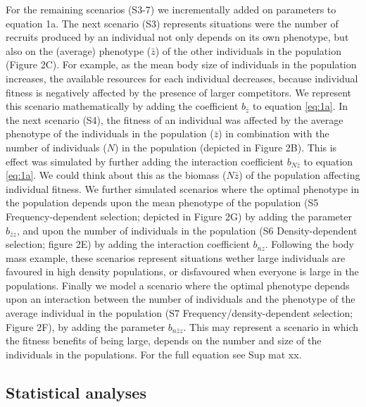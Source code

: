 \documentclass{article}
\begin{document}
For the remaining scenarios (S3-7) we incrementally added on parameters to equation 1a. The next scenario (S3) represents situations were the number of recruits produced by an individual not only depends on its own phenotype, but also on the (average) phenotype ($\bar{z}$) of the other individuals in the population (Figure 2C). For example, as the mean body size of individuals in the population increases, the available resources for each individual decreases, because individual fitness is negatively affected by the presence of larger competitors. We represent this scenario mathematically by adding the coefficient $b_{\bar{z}}$ to equation \ref{eq:1a}. In the next scenario (S4), the fitness of an individual was affected by the average phenotype of the individuals in the population ($\bar{z}$) in combination with the number of individuals ($N$) in the population (depicted in Figure 2B). This is effect was simulated by further adding the interaction coefficient $b_{N\bar{z}}$ to equation \ref{eq:1a}. We could think about this as the biomass (${N\bar{z}}$) of the population affecting individual fitness. We further simulated scenarios where the optimal phenotype in the population depends upon the mean phenotype of the population (S5 Frequency-dependent selection; depicted in Figure 2G) by adding the parameter $b_{\bar{z}z}$, and upon the number of individuals in the population (S6 Density-dependent selection; figure 2E) by adding the interaction coefficient $b_{nz}$. Following the body mass example, these scenarios represent situations wether large individuals are favoured in high density populations, or disfavoured when everyone is large in the populations. Finally we model a scenario where the optimal phenotype depends upon an interaction between the number of individuals and the phenotype of the average individual in the population (S7 Frequency/density-dependent selection; Figure 2F), by adding the parameter $b_{n\bar{z}z}$. This may represent a scenario in which the fitness benefits of being large, depends on the number and size of the individuals in the populations. For the full equation see Sup mat xx.


\subsection{Statistical analyses}
\end{document}
